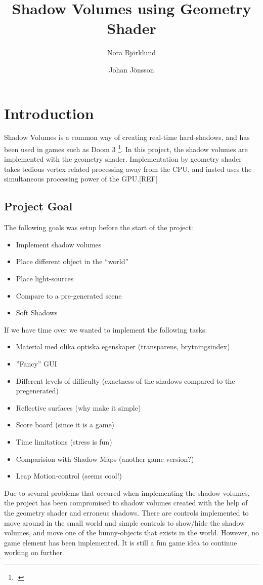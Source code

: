 \documentclass[a4paper, 12pt]{article}
\title{Shadow Volumes using Geometry Shader}
\author{Nora Björklund \and Johan Jönsson}
\begin{document}
\maketitle
\tableofcontents
\newpage
\section{Introduction}
Shadow Volumes is a common way of creating real-time hard-shadows, and has been used in games such as Doom 3 \footcite{gpug1}. In this project, the shadow volumes are implemented with the geometry shader. Implementation by geometry shader takes tedious vertex related processing away from the CPU, and insted uses the simultaneous processing power of the GPU.[REF]
\subsection{Project Goal}
The following goals was setup before the start of the project:
\begin{itemize}
\item Implement shadow volumes
\item Place different object in the ``world''
\item Place light-sources
\item Compare to a pre-generated scene 
\item Soft Shadows
\end{itemize}
If we have time over we wanted to implement the following tasks:
\begin{itemize}
\item Material med olika optiska egenskaper (transparens, brytningsindex)
\item  ”Fancy” GUI
\item  Different levels of difficulty (exactness of the shadows compared to the pregenerated)
\item  Reflective surfaces (why make it simple)
\item  Score board (since it is a game)
\item  Time limitations (stress is fun)
\item  Comparision with Shadow Maps (another game version?)
\item  Leap Motion-control (seems cool!)
\end{itemize}

Due to sevaral problems that occured when implementing the shadow volumes, the project has been compromised to shadow volumes created with the help of the geometry shader and erroneus shadows. There are controls implemented to move around in the small world and simple controls to show/hide the shadow volumes, and move one of the bunny-objects that exists in the world. However, no game element has been implemented. It is still a fun game idea to continue working on further.
\end{document}
